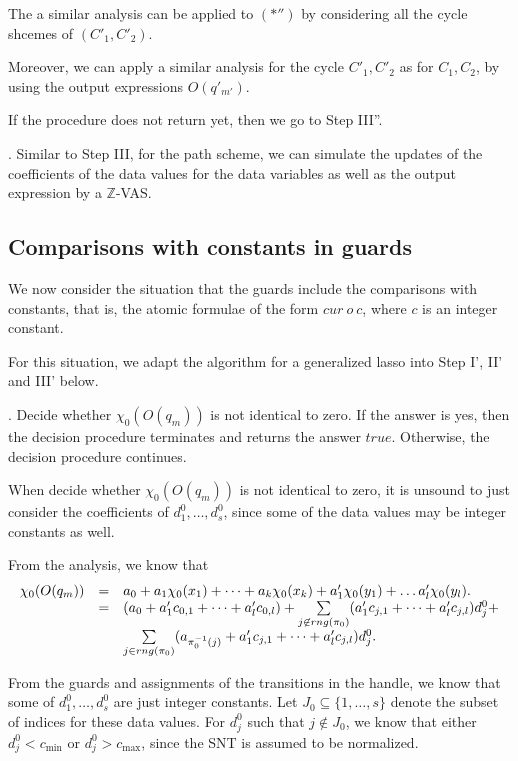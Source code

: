 \documentclass[runningheads,a4paper]{llncs}
\newcommand\intnum{{\mathbb{Z} }}
\begin{document}
The a similar analysis can be applied to $(\ast'')$ by considering all the cycle shcemes of $(C'_1,C'_2)$.

Moreover, we can apply a similar analysis for the cycle $C'_1,C'_2$ as for $C_1,C_2$, by using the output expressions $O(q'_{m'})$.

If the procedure does not return yet, then we go to Step III''.

\smallskip

. Similar to Step III, for the path scheme, we can simulate the updates of the coefficients of the data values for the data variables as well as the output expression by a $\intnum$-VAS.

\subsection{Comparisons with constants in guards}

We now consider the situation that the guards include the comparisons with constants, that is, the atomic formulae of the form $cur\ o\ c$, where $c$ is an integer constant. 

For this situation, we adapt the algorithm for a generalized lasso into Step I', II' and III' below.

\smallskip

. Decide whether $\chi_0(O(q_m))$ is not identical to zero. If the answer is yes, then the decision procedure terminates and returns the answer $true$. Otherwise, the decision procedure continues.

When decide whether $\chi_0(O(q_m))$ is not identical to zero, it is unsound to just consider the coefficients of $d^0_1,\dots,d^0_s$, since some of the data values may be integer constants as well. 

From the analysis, we know that 
\[
\begin{array}{l c l }
\chi_0(O(q_m)) & = & a_0 + a_1 \chi_0(x_1) + \dots + a_k \chi_0(x_k) + a'_1 \chi_0(y_1) + \dots a'_l \chi_0(y_l).\\
& = & (a_0+a'_1 c_{0,1} + \dots + a'_l c_{0,l}) + \sum \limits_{j \not \in rng(\pi_0)}  (a'_1 c_{j,1}+\dots + a'_l c_{j,l}) d^0_j+\\
& & \sum \limits_{j \in rng(\pi_0)} (a_{\pi_0^{-1}(j)}+ a'_1 c_{j,1}+\dots + a'_l c_{j,l}) d^0_j.
\end{array}
\]

From the guards and assignments of the transitions in the handle, we know that some of $d^0_1,\dots,d^0_s$ are just integer constants. Let $J_0 \subseteq \{1,\dots,s\}$ denote the subset of indices for these data values. For $d^0_j$ such that $j \not \in J_0$, we know that either $d^0_j < c_{\min}$ or $d^0_j > c_{\max}$, since the SNT is assumed to be normalized.
\end{document}
